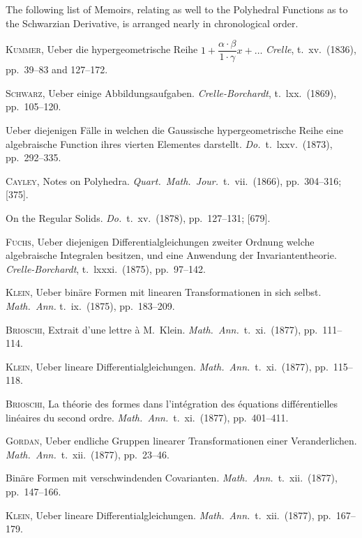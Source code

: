 \documentclass[11pt]{article}
\begin{document}
The following list of Memoirs, relating as well to the Polyhedral Functions as to
the Schwarzian Derivative, is arranged nearly in chronological order.

\medskip

\noindent
\textsc{Kummer}, Ueber die hypergeometrische Reihe $1 + \dfrac{\alpha \cdot \beta}{1 \cdot \gamma}x + \ldots$ \textit{Crelle}, t.\ xv.\ (1836),
pp.\ 39--83 and 127--172.

\noindent
\textsc{Schwarz}, Ueber einige Abbildungsaufgaben. \textit{Crelle-Borchardt}, t.\ lxx.\ (1869), pp.\ 105--120.

\noindent
{} Ueber diejenigen F\"alle in welchen die Gaussische hypergeometrische Reihe
eine algebraische Function ihres vierten Elementes darstellt. \textit{Do.}\ t.\ lxxv.\ (1873),
pp.\ 292--335.

\noindent
\textsc{Cayley}, Notes on Polyhedra. \textit{Quart.\ Math.\ Jour.}\ t.\ vii.\ (1866), pp.\ 304--316; [375].

\noindent
{} On the Regular Solids. \textit{Do.}\ t.\ xv.\ (1878), pp.\ 127--131; [679].

\noindent
\textsc{Fuchs}, Ueber diejenigen Differentialgleichungen zweiter Ordnung welche algebraische
Integralen besitzen, und eine Anwendung der Invariantentheorie. \textit{Crelle-Borchardt},
t.\ lxxxi.\ (1875), pp.\ 97--142.

\noindent
\textsc{Klein}, Ueber bin\"are Formen mit linearen Transformationen in sich selbst. \textit{Math.\ Ann.}
t.\ ix.\ (1875), pp.\ 183--209.

\noindent
\textsc{Brioschi}, Extrait d'une lettre \`a M.\ Klein. \textit{Math.\ Ann.}\ t.\ xi.\ (1877), pp.\ 111--114.

\noindent
\textsc{Klein}, Ueber lineare Differentialgleichungen. \textit{Math.\ Ann.}\ t.\ xi.\ (1877), pp.\ 115--118.

\noindent
\textsc{Brioschi}, La th\'eorie des formes dans l'int\'egration des \'equations diff\'erentielles lin\'eaires
du second ordre. \textit{Math.\ Ann.}\ t.\ xi.\ (1877), pp.\ 401--411.

\noindent
\textsc{Gordan}, Ueber endliche Gruppen linearer Transformationen einer Veranderlichen.
\textit{Math.\ Ann.}\ t.\ xii.\ (1877), pp.\ 23--46.

\noindent
{} Bin\"are Formen mit verschwindenden Covarianten. \textit{Math.\ Ann.}\ t.\ xii.\ (1877),
pp.\ 147--166.

\noindent
\textsc{Klein}, Ueber lineare Differentialgleichungen. \textit{Math.\ Ann.}\ t.\ xii.\ (1877), pp.\ 167--179.
\end{document}
